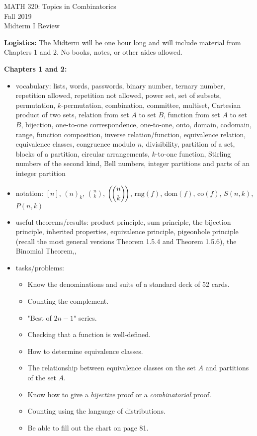 \documentclass[11pt]{article}
\newcommand{\textmultiset}[2]{\bigl(\!{\binom{#1}{#2}}\!\bigr)}
\newcommand{\displaymultiset}[2]{\left(\!{\binom{#1}{#2}}\!\right)}
\newcommand\multiset[2]{\mathchoice{\displaymultiset{#1}{#2}}
                                {\textmultiset{#1}{#2}}
                                {\textmultiset{#1}{#2}}
                                {\textmultiset{#1}{#2}}}
\begin{document}
\begin{center}MATH 320: Topics in Combinatorics  \\ Fall 2019 \\ Midterm I Review\end{center}

\hrulefill

\noindent\textbf{Logistics:} The Midterm will be one hour long and will include material from Chapters 1 and 2. No books, notes, or other aides allowed. \\

\hrulefill

\noindent\textbf{Chapters 1 and 2:} 

\begin{itemize}
\item vocabulary: lists, words, passwords, binary number, ternary number, repetition allowed, repetition not allowed, power set, set of subsets, permutation, $k$-permutation, combination, committee, multiset, Cartesian product of two sets, relation from set $A$ to set $B$, function from set $A$ to set $B$, bijection, one-to-one correspondence, one-to-one, onto, domain, codomain, range, function composition, inverse relation/function, equivalence relation, equivalence classes, congruence modulo $n$, divisibility, partition of a set, blocks of a partition, circular arrangements, $k$-to-one function, Stirling numbers of the second kind, Bell numbers,  integer partitions and parts of an integer partition

\item notation: $[n]$, $(n)_k$, $\displaystyle{n \choose k}$, $\displaystyle{\multiset{n}{k}}$, $\text{rng}(f)$, $\text{dom}(f)$, $\text{co}(f)$, $S(n,k)$, $P(n,k)$

\item useful theorems/results: product principle, sum principle, the bijection principle, inherited properties, equivalence principle, pigeonhole principle (recall the most general versions Theorem 1.5.4 and Theorem 1.5.6), the Binomial Theorem,,

\item tasks/problems:
	\begin{itemize}
	\item Know the denominations and suits of a standard deck of 52 cards.
	\item Counting the complement.
	\item "Best of $2n-1$" series.
	\item Checking that a function is well-defined.
	\item How to determine equivalence classes.
	\item The relationship between equivalence classes on the set $A$ and partitions of the set $A.$
	\item Know how to give a \emph{bijective} proof or a \emph{combinatorial} proof.
	\item Counting using the language of distributions.
	\item Be able to fill out the chart on page 81.
	\end{itemize}


\end{itemize}
\end{document}
